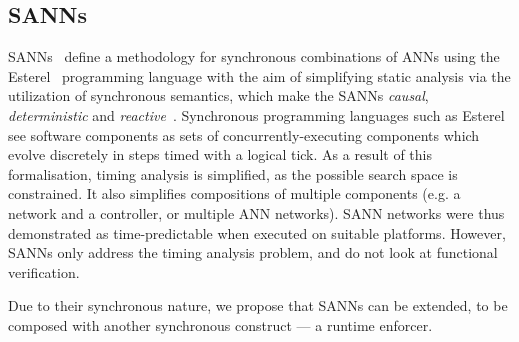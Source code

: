 
\subsection{\acfp{SANN}}

\acp{SANN}~\cite{sann} define a methodology for synchronous combinations of \acp{ANN} using the Esterel~\cite{berry2000foundations} programming language with the aim of simplifying static analysis via the utilization of synchronous semantics, which make the \acp{SANN} \textit{causal}, \textit{deterministic} and \textit{reactive}~\cite{benveniste2003synchronous}. 
Synchronous programming languages such as Esterel see software components as sets of concurrently-executing components which evolve discretely in steps timed with a logical tick.
As a result of this formalisation, timing analysis is simplified, as the possible search space is constrained.
It also simplifies compositions of multiple components (e.g. a network and a controller, or multiple \ac{ANN} networks).
\ac{SANN} networks were thus demonstrated as time-predictable when executed on suitable platforms.
However, \acp{SANN} only address the timing analysis problem, and do not look at functional verification.


Due to their synchronous nature, we propose that \acp{SANN} can be extended, to be composed with another synchronous construct --- a runtime enforcer.




